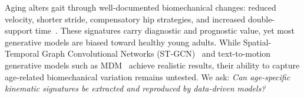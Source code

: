 Aging alters gait through well-documented biomechanical changes: reduced velocity, shorter stride, compensatory hip strategies, and increased double-support time~\cite{boyer2023nia, studenski2011gait}. These signatures carry diagnostic and prognostic value, yet most generative models are biased toward healthy young adults. While Spatial-Temporal Graph Convolutional Networks (ST-GCN)~\cite{yan2018stgcn} and text-to-motion generative models such as MDM~\cite{tevet2023human} achieve realistic results, their ability to capture age-related biomechanical variation remains untested. We ask: \emph{Can age-specific kinematic signatures be extracted and reproduced by data-driven models?}